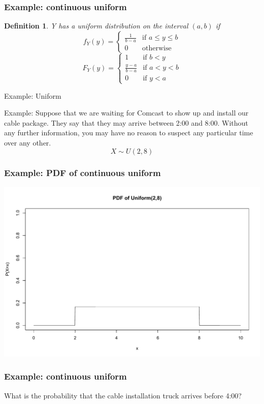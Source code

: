 \documentclass[aspectratio=169, handout]{beamer}
\newtheorem{defn}{Definition}
\numberwithin{equation}{section}
\begin{document}
\begin{frame}
\frametitle{Example: continuous uniform}

\begin{defn}
Y has a uniform distribution on the interval $(a,b)$ if
$$f_Y(y)=\begin{cases} \frac{1}{b-a}& \text{if } a\leq y\leq b\\ 0 & \text{otherwise} \end{cases}$$
$$F_Y(y)=\begin{cases} 1 & \text{if } b<y\\\frac{y-a}{b-a}& \text{if } a<y<b\\ 0 & \text{if } y<a\ \end{cases}$$
\end{defn}

\end{frame}
\begin{frame}{Example: Uniform}

Example: Suppose that we are waiting for Comcast to show up and install our cable package.  They say that they may arrive between 2:00 and 8:00.  Without any further information, you may have no reason to suspect any particular time over any other.
$$X\sim U(2,8)$$

\end{frame}



\begin{frame}
\frametitle{Example: PDF of continuous uniform}
\begin{center}
\includegraphics[width=4 in]{images/Udists2.pdf}
\end{center}

\end{frame}




\begin{frame}
\frametitle{Example: continuous uniform }
What is the probability that the cable installation truck arrives before 4:00?

\end{frame}
\end{document}
